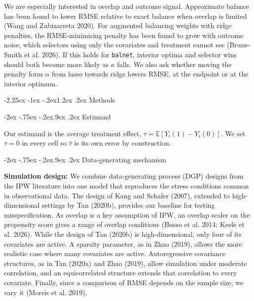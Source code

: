 \documentclass[
  12pt,
  a4paper,
]{article}
\makeatletter
\renewcommand\section{\@startsection{section}{1}{\z@}%
  {-2.25ex \@plus -1ex \@minus -.2ex}{1.2ex \@plus .2ex}%
  {\normalfont\Large\bfseries}}
\renewcommand\subsection{\@startsection{subsection}{2}{\z@}%
  {-2ex \@plus -.75ex \@minus -.2ex}{.9ex \@plus .2ex}%
  {\normalfont\large\bfseries}}
\makeatother
\begin{document}
We are especially interested in overlap and outcome signal. Approximate
balance has been found to lower RMSE relative to exact balance when
overlap is limited (Wang and Zubizarreta 2020). For augmented balancing
weights with ridge penalties, the RMSE-minimising penalty has been found
to grow with outcome noise, which selectors using only the covariates
and treatment cannot see (Bruns-Smith et al. 2026). If this holds for
\texttt{balnet}, interior optima and selector wins should both become
more likely as \(\kappa\) falls. We also ask whether moving the penalty
form \(\alpha\) from lasso towards ridge lowers RMSE, at the endpoint or
at the interior optimum.

\section{Methods}\label{methods}

\subsection{Estimand}\label{estimand}

Our estimand is the average treatment effect,
\(\tau = \mathbb{E}[Y_i(1) - Y_i(0)]\). We set \(\tau = 0\) in every
cell so \(\hat \tau\) is its own error by construction.

\subsection{Data-generating mechanism}\label{data-generating-mechanism}

\textbf{Simulation design:} We combine data-generating process (DGP)
designs from the IPW literature into one model that reproduces the
stress conditions common in observational data. The design of Kang and
Schafer (2007), extended to high-dimensional settings by Tan (2020b),
provides our baseline for testing misspecification. As overlap is a key
assumption of IPW, an overlap scaler on the propensity score gives a
range of overlap conditions (Busso et al. 2014; Keele et al. 2026).
While the design of Tan (2020b) is high-dimensional, only four of its
covariates are active. A sparsity parameter, as in Zhao (2019), allows
the more realistic case where many covariates are active. Autoregressive
covariance structures, as in Tan (2020a) and Zhao (2019), allow
simulation under moderate correlation, and an equicorrelated structure
extends that correlation to every covariate. Finally, since a comparison
of RMSE depends on the sample size, we vary it (Morris et al. 2019).
\end{document}
